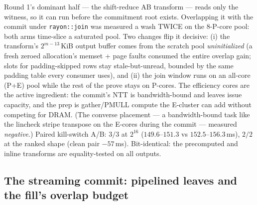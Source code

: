 \documentclass[11pt]{article}
\newcommand{\code}[1]{\texttt{#1}}
\begin{document}
Round 1's dominant half --- the shift-reduce AB transform --- reads only the
witness, so it can run before the commitment root exists. Overlapping it
with the commit under \code{rayon::join} was measured a wash TWICE on the
8-P-core pool: both arms time-slice a saturated pool. Two changes flip it
decisive: (i) the transform's $2^{m-13}$\,KiB output buffer comes from the
scratch pool \emph{uninitialized} (a fresh zeroed allocation's memset +
page faults consumed the entire overlap gain; slots for padding-skipped
rows stay stale-but-unread, bounded by the same padding table every
consumer uses), and (ii) the join window runs on an all-core (P+E) pool
while the rest of the prove stays on P-cores. The efficiency cores are the
active ingredient: the commit's NTT is bandwidth-bound and leaves issue
capacity, and the prep is gather/PMULL compute the E-cluster can add
without competing for DRAM. (The converse placement --- a bandwidth-bound
task like the lincheck stripe transpose on the E-cores during the commit
--- measured \emph{negative}.) Paired kill-switch A/B: $3/3$ at $2^{16}$
($149.6$--$151.3$ vs $152.5$--$156.3$\,ms), $2/2$ at the ranked shape
(clean pair $-57$\,ms). Bit-identical: the precomputed and inline
transforms are equality-tested on all outputs.

\subsection{The streaming commit: pipelined leaves and the fill's overlap budget}
\label{sec:streamcommit}
\end{document}

